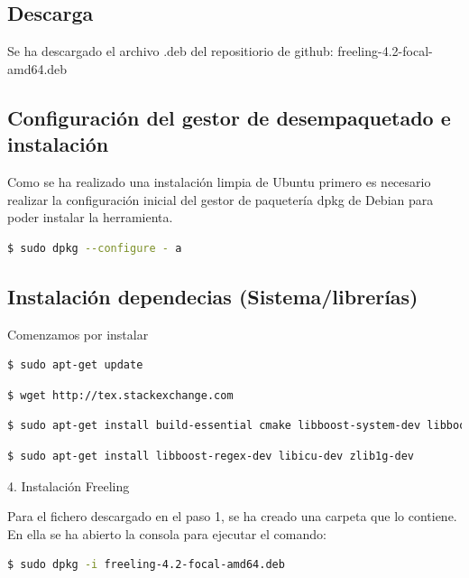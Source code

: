 \documentclass[11pt,twoside]{article}
\numberwithin{equation}{section}
\theoremstyle{plain}
\theoremstyle{definition}
\theoremstyle{remark}
\begin{document}
\subsection{Descarga}
Se ha descargado el archivo .deb del repositiorio de github: freeling-4.2-focal-amd64.deb

\subsection{Configuración del gestor de desempaquetado e instalación}

Como se ha realizado una instalación limpia de Ubuntu primero es necesario realizar la configuración inicial del gestor de paquetería dpkg de Debian para poder instalar la herramienta.
 
\begin{lstlisting}[language=bash]
  $ sudo dpkg --configure - a
\end{lstlisting}

 
\subsection{Instalación dependecias (Sistema/librerías)} 


Comenzamos por instalar 

\begin{lstlisting}[language=bash]
  $ sudo apt-get update
\end{lstlisting}
	

\begin{lstlisting}[language=bash]
  $ wget http://tex.stackexchange.com
\end{lstlisting}
	
\begin{lstlisting}[language=bash]
  $ sudo apt-get install build-essential cmake libboost-system-dev libboost-program-options-dev libboost-thread-dev 
\end{lstlisting}
	

\begin{lstlisting}[language=bash]
  $ sudo apt-get install libboost-regex-dev libicu-dev zlib1g-dev
\end{lstlisting}
	



4. Instalación Freeling

Para el fichero descargado en el paso 1, se ha creado una carpeta que lo contiene. En ella se ha abierto la consola para ejecutar el comando:

\begin{lstlisting}[language=bash]
 	$ sudo dpkg -i freeling-4.2-focal-amd64.deb
\end{lstlisting}
\end{document}
